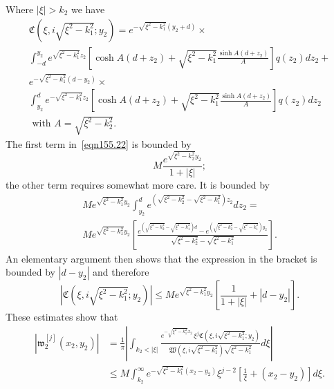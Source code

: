 \documentclass[11pt]{article}
\newcommand\fw{\mathfrak w}
\newcommand\fW{\mathfrak W}
\newcommand\fC{\mathfrak C}
\theoremstyle{definition}
\theoremstyle{remark}
\begin{document}
      Where $|\xi|>k_2$ we have
     \begin{multline}\label{eqn155.22}
        \fC(\xi,i\sqrt{\xi^2-k_1^2};y_2)=
        e^{-\sqrt{\xi^2-k_1^2}(y_2+d)}\times \\
        \int_{-d}^{y_2}e^{\sqrt{\xi^2-k_1^2}
          z_2}\left[\cosh A(d+z_2)+\sqrt{\xi^2-k_1^2}\frac{\sinh
            A(d+z_2)}{A}\right]q(z_2)dz_2+\\ e^{-\sqrt{\xi^2-k_1^2}(d-y_2)}\times \\
        \int_{y_2}^{d}e^{-\sqrt{\xi^2-k_1^2}z_2}\left[\cosh
          A(d+z_2)+\sqrt{\xi^2-k_1^2}\frac{\sinh
            A(d+z_2)}{A}\right]q(z_2)dz_2\\ \text{ with }A=\sqrt{\xi^2-k_2^2}.
     \end{multline}
     The first term in~\eqref{eqn155.22} is bounded by
     \begin{equation}
       M\frac{e^{\sqrt{\xi^2-k_2^2}y_2}}{1+|\xi|};
     \end{equation}
     the other term requires somewhat more care. It is bounded by
     \begin{multline}
       Me^{\sqrt{\xi^2-k_1^2}y_2}\int_{y_2}^{d}e^{(\sqrt{\xi^2-k_2^2}-\sqrt{\xi^2-k_1^2})z_2}dz_2=\\
       Me^{\sqrt{\xi^2-k_1^2}y_2}\left[\frac{e^{(\sqrt{\xi^2-k_2^2}-\sqrt{\xi^2-k_1^2})d}-
           e^{(\sqrt{\xi^2-k_2^2}-\sqrt{\xi^2-k_1^2})y_2}}
         {\sqrt{\xi^2-k_2^2}-\sqrt{\xi^2-k_1^2}}\right].
     \end{multline}
     An elementary argument then shows that the expression in the bracket is
     bounded by $|d-y_2|$ and therefore
     \begin{equation}
       | \fC(\xi,i\sqrt{\xi^2-k_1^2};y_2)|\leq
       Me^{\sqrt{\xi^2-k_1^2}y_2}\left[\frac{1}{1+|\xi|}+|d-y_2|\right].
     \end{equation}
     These estimates show that
     \begin{equation}
       \begin{split}
       |\fw^{[j]}_2(x_2,y_2)|&=\frac{1}{\pi}
       \left|\int_{k_2<|\xi|}\frac{e^{-\sqrt{\xi^2-k_1^2}x_2}\,\xi^j
       \fC(\xi,i\sqrt{\xi^2-k_1^2};y_2)}
                 {\fW(\xi,i\sqrt{\xi^2-k_1^2})\sqrt{\xi^2-k_1^2}}d\xi\right|\\
                 &\leq
                 M\int_{k_2}^{\infty}e^{-\sqrt{\xi^2-k_1^2}(x_2-y_2)}\xi^{j-2}\left[\frac{1}{\xi}+(x_2-y_2)\right]d\xi.
      \end{split}           
     \end{equation}
\end{document}

